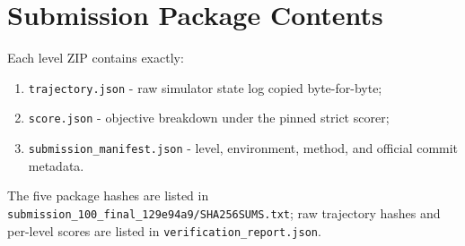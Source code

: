 \documentclass[11pt,a4paper]{article}
\begin{document}
\appendix
\section{Submission Package Contents}

Each level ZIP contains exactly:
\begin{enumerate}
\item \texttt{trajectory.json} - raw simulator state log copied byte-for-byte;
\item \texttt{score.json} - objective breakdown under the pinned strict scorer;
\item \texttt{submission\_manifest.json} - level, environment, method, and official commit metadata.
\end{enumerate}

The five package hashes are listed in \texttt{submission\_100\_final\_129e94a9/SHA256SUMS.txt}; raw trajectory hashes and per-level scores are listed in \texttt{verification\_report.json}.
\end{document}
